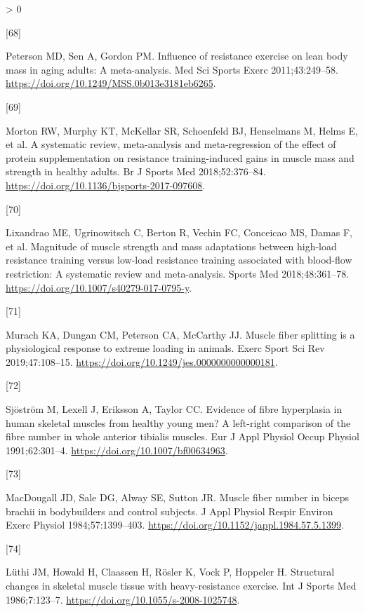 \documentclass[twoside,10pt]{gihclass} %
\newlength{\cslhangindent}
\newlength{\csllabelwidth}
\newenvironment{CSLReferences}[3] %
 {%
  \setlength{\parindent}{0pt}
  \ifodd #1 \everypar{\setlength{\hangindent}{\cslhangindent}}\ignorespaces\fi
  \ifnum #2 > 0
  \setlength{\parskip}{#2\baselineskip}
  \fi
 }%
 {}
\newcommand{\CSLLeftMargin}[1]{\parbox[t]{\maxof{\widthof{#1}}{\csllabelwidth}}{#1}}
\newcommand{\CSLRightInline}[1]{\parbox[t]{\linewidth}{#1}}
\begin{document}
\begin{CSLReferences}{0}{0}
\leavevmode\hypertarget{ref-RN752}{}%
\CSLLeftMargin{{[}68{]} }
\CSLRightInline{Peterson MD, Sen A, Gordon PM. Influence of resistance exercise on lean body mass in aging adults: A meta-analysis. Med Sci Sports Exerc 2011;43:249--58. \url{https://doi.org/10.1249/MSS.0b013e3181eb6265}.}

\leavevmode\hypertarget{ref-RN2199}{}%
\CSLLeftMargin{{[}69{]} }
\CSLRightInline{Morton RW, Murphy KT, McKellar SR, Schoenfeld BJ, Henselmans M, Helms E, et al. A systematic review, meta-analysis and meta-regression of the effect of protein supplementation on resistance training-induced gains in muscle mass and strength in healthy adults. Br J Sports Med 2018;52:376--84. \url{https://doi.org/10.1136/bjsports-2017-097608}.}

\leavevmode\hypertarget{ref-RN2745}{}%
\CSLLeftMargin{{[}70{]} }
\CSLRightInline{Lixandrao ME, Ugrinowitsch C, Berton R, Vechin FC, Conceicao MS, Damas F, et al. Magnitude of muscle strength and mass adaptations between high-load resistance training versus low-load resistance training associated with blood-flow restriction: A systematic review and meta-analysis. Sports Med 2018;48:361--78. \url{https://doi.org/10.1007/s40279-017-0795-y}.}

\leavevmode\hypertarget{ref-RN2741}{}%
\CSLLeftMargin{{[}71{]} }
\CSLRightInline{Murach KA, Dungan CM, Peterson CA, McCarthy JJ. Muscle fiber splitting is a physiological response to extreme loading in animals. Exerc Sport Sci Rev 2019;47:108--15. \url{https://doi.org/10.1249/jes.0000000000000181}.}

\leavevmode\hypertarget{ref-RN2742}{}%
\CSLLeftMargin{{[}72{]} }
\CSLRightInline{Sjöström M, Lexell J, Eriksson A, Taylor CC. Evidence of fibre hyperplasia in human skeletal muscles from healthy young men? A left-right comparison of the fibre number in whole anterior tibialis muscles. Eur J Appl Physiol Occup Physiol 1991;62:301--4. \url{https://doi.org/10.1007/bf00634963}.}

\leavevmode\hypertarget{ref-RN2754}{}%
\CSLLeftMargin{{[}73{]} }
\CSLRightInline{MacDougall JD, Sale DG, Alway SE, Sutton JR. Muscle fiber number in biceps brachii in bodybuilders and control subjects. J Appl Physiol Respir Environ Exerc Physiol 1984;57:1399--403. \url{https://doi.org/10.1152/jappl.1984.57.5.1399}.}

\leavevmode\hypertarget{ref-RN2731}{}%
\CSLLeftMargin{{[}74{]} }
\CSLRightInline{Lüthi JM, Howald H, Claassen H, Rösler K, Vock P, Hoppeler H. Structural changes in skeletal muscle tissue with heavy-resistance exercise. Int J Sports Med 1986;7:123--7. \url{https://doi.org/10.1055/s-2008-1025748}.}


\end{CSLReferences}
\end{document}

